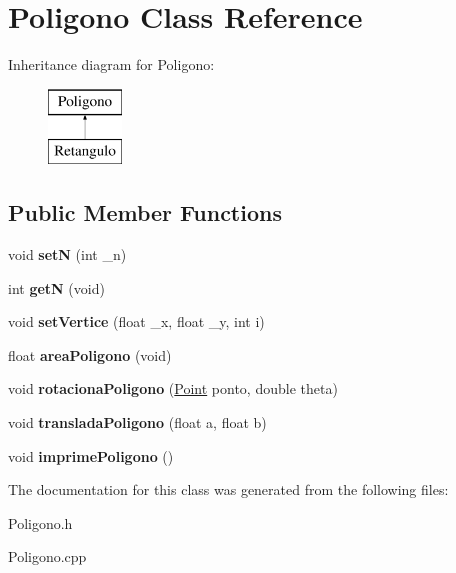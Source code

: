 \hypertarget{classPoligono}{}\section{Poligono Class Reference}
\label{classPoligono}
Inheritance diagram for Poligono\+:\begin{figure}[H]
\begin{center}
\leavevmode
\includegraphics[height=2.000000cm]{classPoligono}
\end{center}
\end{figure}
\subsection*{Public Member Functions}
\begin{DoxyCompactItemize}
\item 
\mbox{\label{classPoligono_a4d4cffe97d7190db1f8598b0f9f95763}} 
void {\bfseries setN} (int \+\_\+n)
\item 
\mbox{\label{classPoligono_a56257204345b9be3bb5d5fbe45ce63f1}} 
int {\bfseries getN} (void)
\item 
\mbox{\label{classPoligono_ae4e04e6cba0515395a9182cdb8ccb7dd}} 
void {\bfseries set\+Vertice} (float \+\_\+x, float \+\_\+y, int i)
\item 
\mbox{\label{classPoligono_a051cc49fca5417dbc8c6ba7a1edc2723}} 
float {\bfseries area\+Poligono} (void)
\item 
\mbox{\label{classPoligono_ab37e1487cfe3360fa4f666dc917c6836}} 
void {\bfseries rotaciona\+Poligono} (\hyperlink{classPoint}{Point} ponto, double theta)
\item 
\mbox{\label{classPoligono_a4d757f52ba9366ab13537fb19b363e1e}} 
void {\bfseries translada\+Poligono} (float a, float b)
\item 
\mbox{\label{classPoligono_a87d58f9d4827793eaa811491cce097b0}} 
void {\bfseries imprime\+Poligono} ()
\end{DoxyCompactItemize}


The documentation for this class was generated from the following files\+:\begin{DoxyCompactItemize}
\item 
Poligono.\+h\item 
Poligono.\+cpp\end{DoxyCompactItemize}
